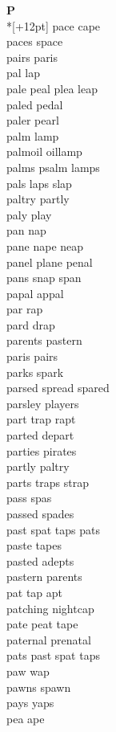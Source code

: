 \vspace{14pt}
\noindent\textbf{\Large P}\\*[+12pt]
pace cape\\
paces space\\
pairs paris\\
pal lap\\
pale peal plea leap\\
paled pedal\\
paler pearl\\
palm lamp\\
palmoil oillamp\\
palms psalm lamps\\
pals laps slap\\
paltry partly\\
paly play\\
pan nap\\
pane nape neap\\
panel plane penal\\
pans snap span\\
papal appal\\
par rap\\
pard drap\\
parents pastern\\
paris pairs\\
parks spark\\
parsed spread spared\\
parsley players\\
part trap rapt\\
parted depart\\
parties pirates\\
partly paltry\\
parts traps strap\\
pass spas\\
passed spades\\
past spat taps pats\\
paste tapes\\
pasted adepts\\
pastern parents\\
pat tap apt\\
patching nightcap\\
pate peat tape\\
paternal prenatal\\
pats past spat taps\\
paw wap\\
pawns spawn\\
pays yaps\\
pea ape\\
